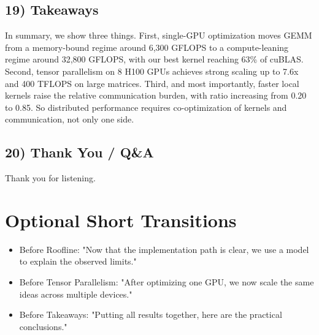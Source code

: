\documentclass[11pt]{article}
\begin{document}

\subsection*{19) Takeaways}
In summary, we show three things. First, single-GPU optimization moves GEMM from a memory-bound regime around 6,300 GFLOPS to a compute-leaning regime around 32,800 GFLOPS, with our best kernel reaching 63\% of cuBLAS. Second, tensor parallelism on 8 H100 GPUs achieves strong scaling up to 7.6x and 400 TFLOPS on large matrices. Third, and most importantly, faster local kernels raise the relative communication burden, with ratio increasing from 0.20 to 0.85. So distributed performance requires co-optimization of kernels and communication, not only one side.

\subsection*{20) Thank You / Q\&A}
Thank you for listening.

\section*{Optional Short Transitions}
\begin{itemize}[leftmargin=1.5em]
  \item Before Roofline: "Now that the implementation path is clear, we use a model to explain the observed limits."
  \item Before Tensor Parallelism: "After optimizing one GPU, we now scale the same ideas across multiple devices."
  \item Before Takeaways: "Putting all results together, here are the practical conclusions."
\end{itemize}
\end{document}
